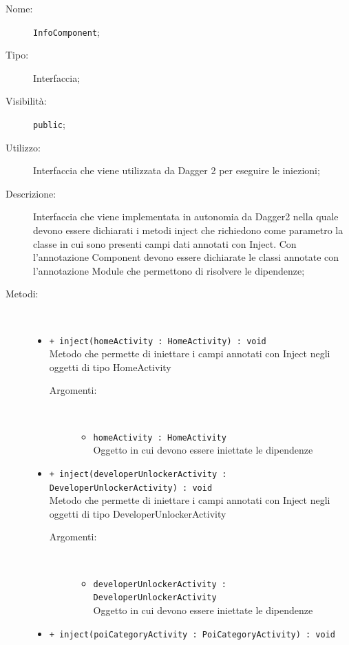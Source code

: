 \documentclass[../DefinizioneDiProdotto.tex]{subfiles}
\begin{document}
\begin{description}
	\item[Nome:] \texttt{InfoComponent};
	\item[Tipo:] Interfaccia;
	\item[Visibilità:] \texttt{public};
	\item[Utilizzo:] Interfaccia che viene utilizzata da Dagger 2 per eseguire le iniezioni;
	\item[Descrizione:] Interfaccia che viene implementata in autonomia da Dagger2 nella quale devono essere dichiarati
	i metodi inject che richiedono come parametro la classe in cui sono presenti campi dati annotati con Inject. Con l'annotazione Component devono essere dichiarate le classi annotate con l'annotazione Module che permettono di risolvere le dipendenze;
	\item[Metodi:] \
	\begin{itemize}
		\item \texttt{+ inject(homeActivity : HomeActivity) : void}\\
		Metodo che permette di iniettare i campi annotati con Inject negli oggetti di tipo HomeActivity
		\begin{description}
			\item[Argomenti:] \
			\begin{itemize}
				\item \texttt{homeActivity : HomeActivity}\\
				Oggetto in cui devono essere iniettate le dipendenze\end{itemize}
		\end{description}
		\item \texttt{+ inject(developerUnlockerActivity : DeveloperUnlockerActivity) : void}\\
		Metodo che permette di iniettare i campi annotati con Inject negli oggetti di tipo DeveloperUnlockerActivity
		\begin{description}
			\item[Argomenti:] \
			\begin{itemize}
				\item \texttt{developerUnlockerActivity : DeveloperUnlockerActivity}\\
				Oggetto in cui devono essere iniettate le dipendenze\end{itemize}
		\end{description}
		\item \texttt{+ inject(poiCategoryActivity : PoiCategoryActivity) : void}\\

\end{itemize}
\end{description}
\end{document}
